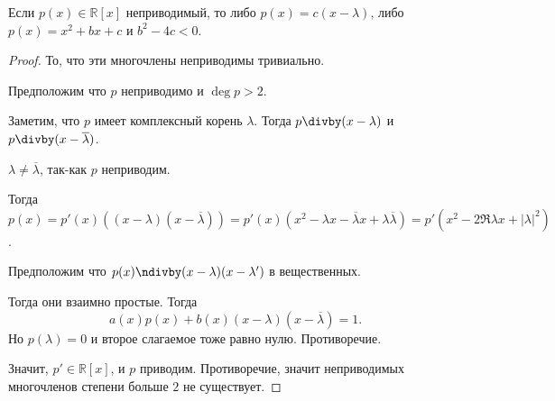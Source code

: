 \begin{statement} 
    Если $p(x)\in \mathbb{R}[x]$ неприводимый, то либо $p(x) = c(x-\lambda)$, либо $p(x) = x^2+bx+c$ и $b^2-4c < 0$.
    \begin{proof}
        То, что эти многочлены неприводимы тривиально.

        Предположим что $p$ неприводимо и $\deg p > 2$.

        Заметим, что $p$ имеет комплексный корень $\lambda$. Тогда $p \divby (x-\lambda)$ и $p \divby (x-\overline{\lambda})$.

        $\lambda \neq \overline{\lambda}$, так-как $p$ неприводим.

        Тогда $p(x) = p'(x) ((x-\lambda)(x-\overline{\lambda})) = p'(x) \left( x^2-\lambda x - \overline{\lambda} x + \lambda \overline{\lambda} \right) = p'\left( x^2 - 2 \Re \lambda x + |\lambda|^2 \right)  $.

        Предположим что $p(x) \ndivby (x-\lambda)(x-\lambda')$ в вещественных.

        Тогда они взаимно простые. Тогда 
        \[ a(x)p(x) + b(x)(x-\lambda)(x-\overline{\lambda})=1 .\]
        Но $p (\lambda) = 0$ и второе слагаемое тоже равно нулю. Противоречие.

        Значит, $p'\in \mathbb{R}[x]$, и $p$ приводим. Противоречие, значит неприводимых многочленов степени больше $2$ не существует.
    \end{proof}
\end{statement}
